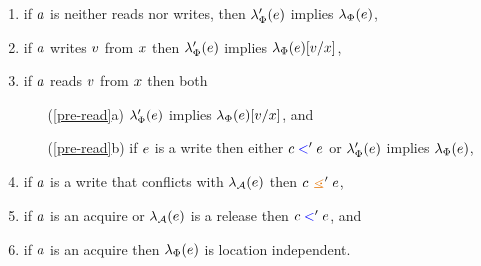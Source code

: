 \begin{definition}
\begin{enumerate}
\item\label{pre-nowrite} if $a$ is neither reads nor writes, then $\lambda_{\Phi}'(e)$
  implies $\lambda_{\Phi}(e)$,
\item\label{pre-write} if $a$ writes $v$ from $x$ then
  $\lambda_{\Phi}'(e)$ implies $\lambda_{\Phi}(e)[v/x]$,
\item\label{pre-read} if $a$ reads $v$ from $x$ then both
  \begin{enumerate}
  \item[(\ref{pre-read}a)] $\lambda_{\Phi}'(e)$ implies $\lambda_{\Phi}(e)[v/x]$, and
  \item[(\ref{pre-read}b)] if $e$ is a write then either $c\mathrel{{\color{blue}<}}'e$
    or $\lambda_{\Phi}'(e)$ implies $\lambda_{\Phi}(e)$,
  \end{enumerate}
\item\label{pre-coherence} if $a$ is a write that conflicts with $\lambda_{\mathcal{A}}(e)$ 
    then $\cEv \gtN' \aEv$,
\item\label{pre-sync} if $a$ is an acquire or $\lambda_{\mathcal{A}}(e)$ is a release then $c \mathrel{{\color{blue}<}}' e$, and
\item\label{pre-acquire} if $a$ is an acquire then $\lambda_{\Phi}(e)$ is location independent.

\end{enumerate}
\end{definition}
